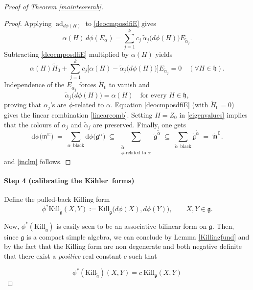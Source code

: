 \documentclass[reqno]{amsart}
\newcommand{\K}{K\"{a}hler}
\newcommand{\Kill}{{\mathrm{Kill}}}
\begin{document}
\begin{proof}[Proof of Theorem \ref{mainteoremb}]
\begin{proof}
Applying \(\operatorname{ad}_{d\phi(H)}\) to \eqref{deocmposdfiE} gives
\[
\alpha(H)\,d\phi(E_\alpha)=
\sum_{j=1}^{k} c_j\,\tilde\alpha_j\bigl(d\phi(H)\bigr) E_{\tilde\alpha_j}.
\]
Subtracting \eqref{deocmposdfiE} multiplied by \(\alpha(H)\) yields
\[
\alpha (H)\tilde H_0+\sum_{j=1}^{k} c_j
  \bigl[ \alpha(H)-\tilde\alpha_j\bigl(d\phi(H)\bigr) \bigr] E_{\tilde\alpha_j}=0
  \quad(\forall H\in\mathfrak{h}). 
\]
Independence of the \(E_{\tilde\alpha_j}\) forces $\tilde H_0$  to vanish and 
\begin{equation}\label{eigenvalues}
\tilde\alpha_j\!\bigl(d\phi(H)\bigr)=\alpha(H)\quad\text{for every }H\in\mathfrak{h},
\end{equation}
proving that $\alpha_j$'s are $\phi$-related to $\alpha$.
Equation \eqref{deocmposdfiE}  (with \(\tilde H_0=0\)) gives the linear combination \eqref{linearcomb}.
Setting \(H=Z_0\) in \eqref{eigenvalues} implies
that  the colours of  $\alpha_j$ and $\tilde\alpha_j$ are  preserved.
Finally, one gets
\[
\mathrm{d}\phi\bigl(\mathfrak{m}^{\mathbb{C}}\bigr)
   \;=\;
   \sum_{\alpha\,\text{ black}}
   \mathrm{d}\phi\bigl(\mathfrak{g}^{\alpha}\bigr)
   \;\subseteq\;
   \sum_{\substack{\tilde{\alpha}\\\text{$\phi$-related to }\alpha}}
   \tilde{\mathfrak{g}}^{\tilde{\alpha}}
   \;\subseteq\;
   \sum_{\tilde{\alpha}\,\text{ black}}
   \tilde{\mathfrak{g}}^{\tilde{\alpha}}
   \;=\;
   \tilde{\mathfrak{m}}^{\mathbb{C}}.
\]
and \eqref{inclm} follows.
\end{proof}

\smallskip

\paragraph{\bf Step 4 (calibrating the \K\ forms)}
Define the pulled-back Killing form
\[
\phi^{*}\Kill_{\tilde{\mathfrak{g}}}(X,Y):=
  \Kill_{\tilde{\mathfrak{g}}}\!\bigl(d\phi(X),d\phi(Y)\bigr),
  \qquad X,Y\in\mathfrak{g}.
\]

Now, $\phi^*(\Kill_{\tilde{\mathfrak{g}}})$ is easily seen to be an associative bilinear form on $\mathfrak{g}$.
Then,  since  $\mathfrak{g}$ is a compact simple algebra, we can conclude by Lemma \ref{Killingfund} and by  the fact that the Killing form are non degenerate and both negative definite that
there exist a   {\em positive} real constant $c$ such that 

\begin{equation}\label{constantc}
\phi^*(\Kill_{\tilde{\mathfrak{g}}})(X, Y) = c\  \Kill_{\mathfrak{g}}(X, Y)
\end{equation}



\end{proof}
\end{document}
